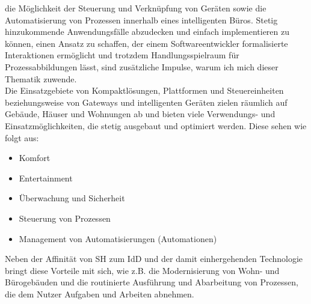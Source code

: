     die Möglichkeit der Steuerung und Verknüpfung von Geräten sowie die Automatisierung von Prozessen innerhalb eines intelligenten Büros. 
    Stetig hinzukommende Anwendungsfälle abzudecken und einfach implementieren zu können, einen Ansatz zu schaffen, der einem 
    Softwareentwickler formalisierte Interaktionen ermöglicht und trotzdem Handlungsspielraum für Prozessabbildungen lässt, sind 
    zusätzliche Impulse, warum ich mich dieser Thematik zuwende. 
    \\ 
    \linebreak
    Die Einsatzgebiete von Kompaktlösungen, Plattformen und Steuereinheiten beziehungsweise von Gateways und intelligenten Geräten zielen räumlich 
    auf Gebäude, Häuser und Wohnungen ab und bieten viele Verwendungs- und Einsatzmöglichkeiten, die stetig ausgebaut und optimiert werden. 
    Diese sehen wie folgt aus: 
    \begin{itemize}
        \item Komfort
        \item Entertainment
        \item Überwachung und Sicherheit
        \item Steuerung von Prozessen
        \item Management von Automatisierungen (Automationen)
    \end{itemize}    
    Neben der Affinität von \acl{SH} zum \acl{IdD} und der damit einhergehenden Technologie bringt diese Vorteile mit sich, wie z.B. 
    die Modernisierung von Wohn- und Bürogebäuden und die routinierte Ausführung und Abarbeitung von Prozessen, die dem Nutzer 
    Aufgaben und Arbeiten abnehmen.
\pagebreak
